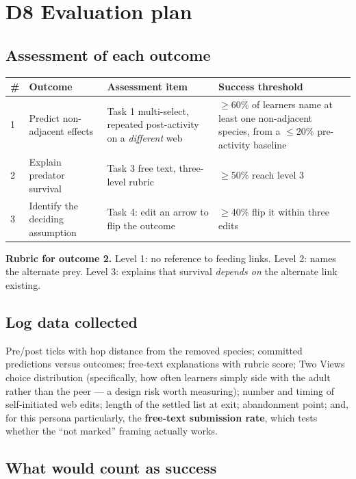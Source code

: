 \documentclass[11pt,a4paper]{article}
\begin{document}
\section{D8 \quad Evaluation plan}

\subsection*{Assessment of each outcome}

\begin{longtable}{@{}p{0.4cm}p{3.6cm}p{5.4cm}p{5.2cm}@{}}
\toprule
\textbf{\#} & \textbf{Outcome} & \textbf{Assessment item} & \textbf{Success threshold}\\
\midrule
\endhead
1 & Predict non-adjacent effects & Task 1 multi-select, repeated post-activity on a
    \emph{different} web & $\geq$60\% of learners name at least one non-adjacent species, from a
    $\leq$20\% pre-activity baseline\\
2 & Explain predator survival & Task 3 free text, three-level rubric & $\geq$50\% reach level 3\\
3 & Identify the deciding assumption & Task 4: edit an arrow to flip the outcome &
    $\geq$40\% flip it within three edits\\
\bottomrule
\end{longtable}

\textbf{Rubric for outcome 2.} Level 1: no reference to feeding links. Level 2: names the
alternate prey. Level 3: explains that survival \emph{depends on} the alternate link existing.

\subsection*{Log data collected}

Pre/post ticks with hop distance from the removed species; committed predictions versus outcomes;
free-text explanations with rubric score; Two Views choice distribution (specifically, how often
learners simply side with the adult rather than the peer --- a design risk worth measuring);
number and timing of self-initiated web edits; length of the settled list at exit; abandonment
point; and, for this persona particularly, the \textbf{free-text submission rate}, which tests
whether the ``not marked'' framing actually works.

\subsection*{What would count as success}
\end{document}
